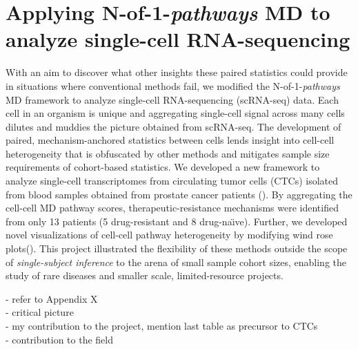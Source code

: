 \chapter{Applying N-of-1-\emph{pathways} MD to analyze single-cell RNA-sequencing} \label{Chap:ctcs}

With an aim to discover what other insights these paired statistics could provide in situations where conventional methods fail, we modified the N-of-1-\emph{pathways} MD framework to analyze single-cell RNA-sequencing (scRNA-seq) data. Each cell in an organism is unique and aggregating single-cell signal across many cells dilutes and muddies the picture obtained from scRNA-seq. The development of paired, mechanism-anchored statistics between cells lends insight into cell-cell heterogeneity that is obfuscated by other methods and mitigates sample size requirements of cohort-based statistics. We developed a new framework to analyze single-cell transcriptomes from circulating tumor cells (CTCs) isolated from blood samples obtained from prostate cancer patients (\cite{Patel2014,Schissler2016}). By aggregating the cell-cell MD pathway scores, therapeutic-resistance mechanisms were identified from only 13 patients (5 drug-resistant and 8 drug-na\"{\i}ve). Further, we developed novel visualizations of cell-cell pathway heterogeneity by modifying wind rose plots(\cite{Court1963}). This project illustrated the flexibility of these methods outside the scope of \emph{single-subject inference} to the arena of small sample cohort sizes, enabling the study of rare diseases and smaller scale, limited-resource projects. 

- refer to Appendix X \\
- critical picture\\
- my contribution to the project, mention last table as precursor to CTCs\\ 
- contribution to the field\\

